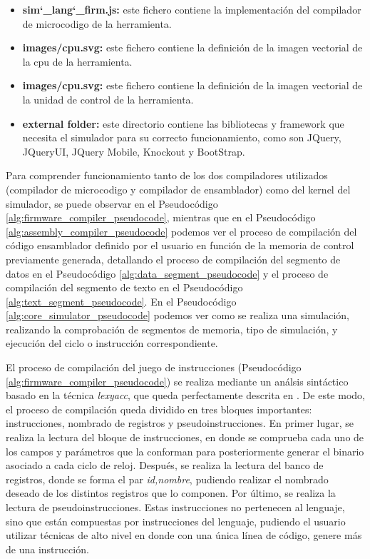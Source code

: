 \begin{itemize}
\item \textbf{sim\char`_lang\char`_firm.js: } este fichero contiene la implementación del compilador de \gls{microcodigo} de la herramienta.

\item \textbf{images/cpu.svg: } este fichero contiene la definición de la imagen vectorial de la \acrshort{cpu} de la herramienta.

\item \textbf{images/cpu.svg: } este fichero contiene la definición de la imagen vectorial de la unidad de control de la herramienta.

\item \textbf{external folder: } este directorio contiene las bibliotecas y \gls{framework} que necesita el simulador para su correcto funcionamiento, como son JQuery, JQueryUI, JQuery Mobile, Knockout y BootStrap.

\end{itemize}

Para comprender funcionamiento tanto de los dos compiladores utilizados (compilador de \gls{microcodigo} y compilador de \gls{ensamblador}) como del kernel del simulador, se puede observar en el Pseudocódigo \ref{alg:firmware_compiler_pseudocode}, mientras que en el Pseudocódigo \ref{alg:assembly_compiler_pseudocode} podemos ver el proceso de compilación del código \gls{ensamblador} definido por el usuario en función de la memoria de control previamente generada, detallando el proceso de compilación del segmento de datos en el Pseudocódigo \ref{alg:data_segment_pseudocode} y el proceso de compilación del segmento de texto en el Pseudocódigo \ref{alg:text_segment_pseudocode}. En el Pseudocódigo \ref{alg:core_simulator_pseudocode} podemos ver como se realiza una simulación, realizando la comprobación de segmentos de memoria, tipo de simulación, y ejecución del ciclo o instrucción correspondiente.

El proceso de compilación del juego de instrucciones (Pseudocódigo \ref{alg:firmware_compiler_pseudocode}) se realiza mediante un análsis sintáctico basado en la técnica \textit{\gls{lexyacc}}, que queda perfectamente descrita en \cite{bennett1996introduction}. De este modo, el proceso de compilación queda dividido en tres bloques importantes: instrucciones, nombrado de registros y pseudoinstrucciones. En primer lugar, se realiza la lectura del bloque de instrucciones, en donde se comprueba cada uno de los campos y parámetros que la conforman para posteriormente generar el binario asociado a cada ciclo de reloj. Después, se realiza la lectura del banco de registros, donde se forma el par \textit{id,nombre}, pudiendo realizar el nombrado deseado de los distintos registros que lo componen. Por último, se realiza la lectura de pseudoinstrucciones. Estas instrucciones no pertenecen al lenguaje, sino que están compuestas por instrucciones del lenguaje, pudiendo el usuario utilizar técnicas de alto nivel en donde con una única línea de código, genere más de una instrucción.

